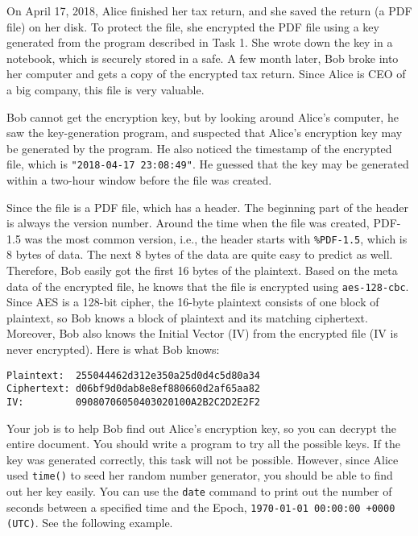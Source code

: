 On April 17, 2018, Alice finished her tax return, and she
saved the return (a PDF file) on her disk. To protect the file, she encrypted the PDF file 
using a key generated from the program described in Task 1. She wrote down the key
in a notebook, which is securely stored in a safe. 
A few month later, Bob broke into her computer and gets a copy of the encrypted 
tax return. Since Alice is CEO of a big company, this file is very valuable. 


Bob cannot get the encryption key, but by looking around Alice's computer, he 
saw the key-generation program, and suspected that Alice's encryption key may
be generated by the program. He also noticed the timestamp of the encrypted file, which
is \texttt{"2018-04-17 23:08:49"}. He guessed that the 
key may be generated within a two-hour window before the file was 
created. 


Since the file is a PDF file, which has a header. The 
beginning part of the header is always the version number. Around 
the time when the file was created, PDF-1.5 was the most common version,
i.e., the header starts with \texttt{\%PDF-1.5}, which 
is 8 bytes of data. The next 8 bytes of the data are quite easy to 
predict as well. Therefore, Bob easily got the first 16 bytes of the plaintext.
Based on the meta data of the encrypted file, he knows that 
the file is encrypted using \texttt{aes-128-cbc}. Since AES is a 128-bit cipher, the 16-byte
plaintext consists of one block of plaintext, so Bob knows a block of plaintext and its
matching ciphertext. Moreover, Bob also knows 
the Initial Vector (IV) from the encrypted file (IV is never encrypted).
Here is what Bob knows:


\begin{lstlisting}
Plaintext:  255044462d312e350a25d0d4c5d80a34
Ciphertext: d06bf9d0dab8e8ef880660d2af65aa82
IV:         09080706050403020100A2B2C2D2E2F2 
\end{lstlisting}
 

Your job is to help Bob find out Alice's encryption key, so you can decrypt the entire
document. You should write a program
to try all the possible keys. If the key was generated correctly, this task will not be
possible. However, since Alice used \texttt{time()} to seed her random number generator, you
should be able to find out her key easily. You can use the \texttt{date} command to print out
the number of seconds between
a specified time and the Epoch, \texttt{1970-01-01 00:00:00 +0000 (UTC)}.
See the following example. 

